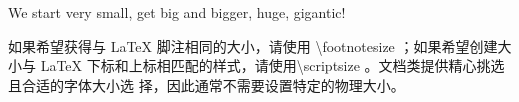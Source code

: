 \documentclass{article}
\begin{document}
\tiny We \scriptsize start \footnotesize very \small small, \normalsize get \large big \Large and \LARGE bigger, \huge huge, \Huge gigantic!

\normalsize

如果希望获得与 {\LaTeX} 脚注相同的大小，请使用 \textbackslash footnotesize ；如果希望创建大小与
{\LaTeX} 下标和上标相匹配的样式，请使用\textbackslash scriptsize 。文档类提供精心挑选且合适的字体大小选
择，因此通常不需要设置特定的物理大小。
\end{document}
